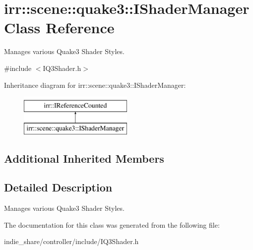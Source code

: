 \hypertarget{classirr_1_1scene_1_1quake3_1_1IShaderManager}{}\section{irr\+:\+:scene\+:\+:quake3\+:\+:I\+Shader\+Manager Class Reference}
\label{classirr_1_1scene_1_1quake3_1_1IShaderManager}


Manages various Quake3 Shader Styles.  




{\ttfamily \#include $<$I\+Q3\+Shader.\+h$>$}

Inheritance diagram for irr\+:\+:scene\+:\+:quake3\+:\+:I\+Shader\+Manager\+:\begin{figure}[H]
\begin{center}
\leavevmode
\includegraphics[height=2.000000cm]{classirr_1_1scene_1_1quake3_1_1IShaderManager}
\end{center}
\end{figure}
\subsection*{Additional Inherited Members}


\subsection{Detailed Description}
Manages various Quake3 Shader Styles. 

The documentation for this class was generated from the following file\+:\begin{DoxyCompactItemize}
\item 
indie\+\_\+share/controller/include/I\+Q3\+Shader.\+h\end{DoxyCompactItemize}
